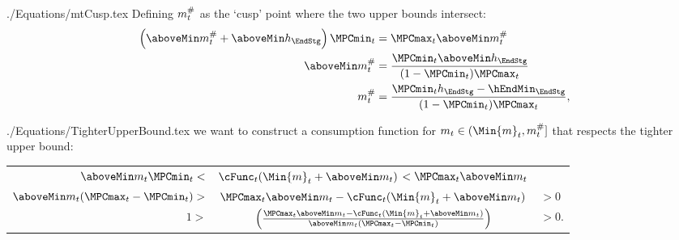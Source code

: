 \documentclass[SolvingMicroDSOPs]{subfiles}
\begin{document}
\begin{verbatimwrite}{./Equations/mtCusp.tex}
  Defining $m_{t}^{\#}$ as the `cusp' point where the two upper bounds
  intersect:
  \begin{equation*}\begin{gathered}\begin{aligned}
        \left(\aboveMin \mtCusp+\aboveMin \hNrm_{\EndStg}\right)\MPCmin_{\prd}  & =  \MPCmax_{\prd} \aboveMin \mtCusp \\
        \aboveMin \mtCusp  & =  \frac{\MPCmin_{\prd}\aboveMin \hNrm_{\EndStg}}{(1-\MPCmin_{\prd})\MPCmax_{\prd}} \\
        \mtCusp  & =  \frac{\MPCmin_{\prd}\hNrm_{\EndStg}-\hEndMin_{\EndStg}}{(1-\MPCmin_{\prd})\MPCmax_{\prd}},
      \end{aligned}\end{gathered}\end{equation*}
\end{verbatimwrite}
\unskip
\begin{verbatimwrite}{./Equations/TighterUpperBound.tex}
  we want to construct a consumption function for $m_{\prd} \in (\Min{m}_{\prd}, \mtCusp]$ that respects the
  tighter upper bound:
  \begin{center}
    \begin{tabular}{rcl}
      $ \aboveMin \mNrm_{\prd} \MPCmin_{\prd} < $ & $ \cFunc_{\prd}(\Min{m}_{\prd}+\aboveMin \mNrm_{\prd}) $  $< \MPCmax_{\prd} \aboveMin \mNrm_{\prd} $
      \\  $ \aboveMin \mNrm_{\prd}(\MPCmax_{\prd}- \MPCmin_{\prd}) > $ & $ \MPCmax_{\prd} \aboveMin \mNrm_{\prd}-\cFunc_{\prd}(\Min{m}_{\prd}+\aboveMin \mNrm_{\prd}) $ & $> 0$
      \\  $1 > $ & $ \left(\frac{\MPCmax_{\prd} \aboveMin \mNrm_{\prd}-\cFunc_{\prd}(\Min{m}_{\prd}+\aboveMin \mNrm_{\prd})}{\aboveMin \mNrm_{\prd}(\MPCmax_{\prd}- \MPCmin_{\prd})}\right) $ & $> 0$.
    \end{tabular}
  \end{center}
\end{verbatimwrite}
\unskip
\end{document}
